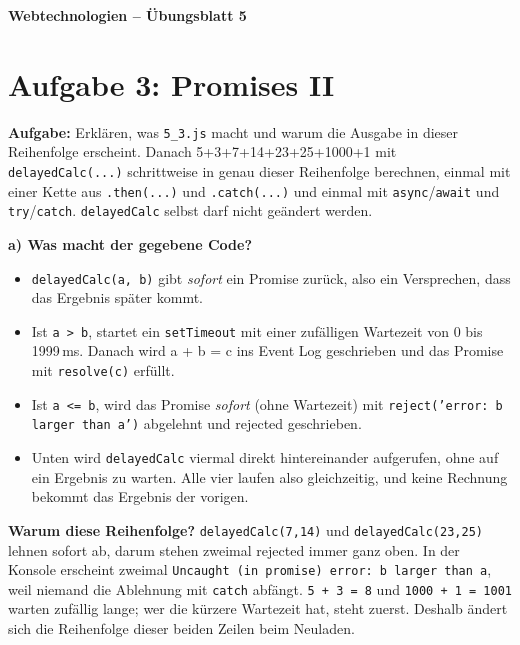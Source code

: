 \documentclass[11pt,a4paper]{article}
\begin{document}
\begin{center}
  {\Large\textbf{Webtechnologien -- Übungsblatt 5}}
\end{center}
\section*{Aufgabe 3: Promises II}
\textbf{Aufgabe:} Erklären, was \texttt{5\_3.js} macht und warum die
Ausgabe in dieser Reihenfolge erscheint. Danach
5+3+7+14+23+25+1000+1 mit \texttt{delayedCalc(...)} schrittweise in genau
dieser Reihenfolge berechnen, einmal mit einer Kette aus
\texttt{.then(...)} und \texttt{.catch(...)} und einmal mit
\texttt{async}/\texttt{await} und \texttt{try}/\texttt{catch}.
\texttt{delayedCalc} selbst darf nicht geändert werden.

\medskip
\textbf{a) Was macht der gegebene Code?}
\begin{itemize}
  \item \texttt{delayedCalc(a, b)} gibt \emph{sofort} ein Promise zurück,
    also ein Versprechen, dass das Ergebnis später kommt.
  \item Ist \texttt{a > b}, startet ein \texttt{setTimeout} mit einer
    zufälligen Wartezeit von 0 bis 1999\,ms. Danach wird
    \glqq a + b = c\grqq{} ins Event Log geschrieben und das Promise mit
    \texttt{resolve(c)} erfüllt.
  \item Ist \texttt{a <= b}, wird das Promise \emph{sofort} (ohne Wartezeit)
    mit \texttt{reject('error: b larger than a')} abgelehnt und
    \glqq rejected\grqq{} geschrieben.
  \item Unten wird \texttt{delayedCalc} viermal direkt hintereinander
    aufgerufen, ohne auf ein Ergebnis zu warten. Alle vier laufen also
    gleichzeitig, und keine Rechnung bekommt das Ergebnis der vorigen.
\end{itemize}
\textbf{Warum diese Reihenfolge?} \texttt{delayedCalc(7,14)} und
\texttt{delayedCalc(23,25)} lehnen sofort ab, darum stehen zweimal
\glqq rejected\grqq{} immer ganz oben. In der Konsole erscheint zweimal
\texttt{Uncaught (in promise) error: b larger than a}, weil niemand die
Ablehnung mit \texttt{catch} abfängt. \texttt{5 + 3 = 8} und
\texttt{1000 + 1 = 1001} warten zufällig lange; wer die kürzere Wartezeit
hat, steht zuerst. Deshalb ändert sich die Reihenfolge dieser beiden
Zeilen beim Neuladen.
\end{document}
